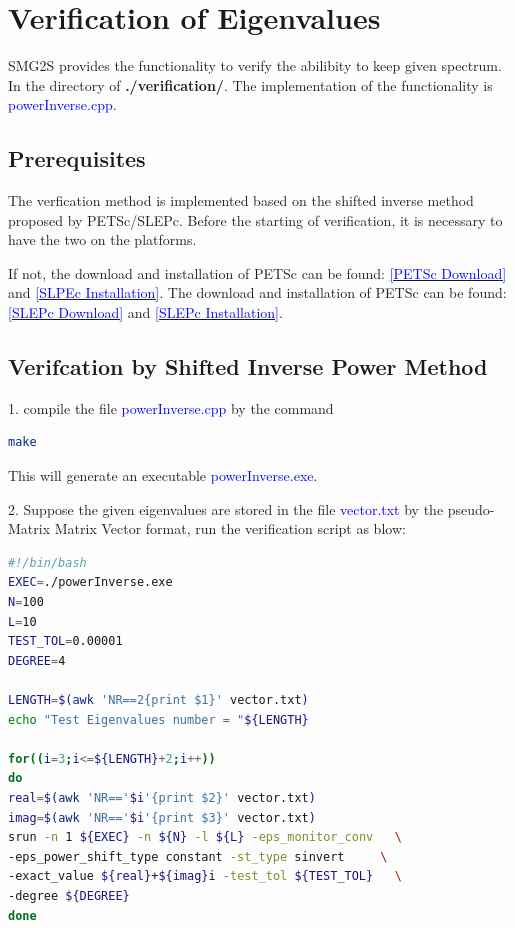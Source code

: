 \documentclass[a4paper, 10 pt]{report}
\begin{document}
	\chapter{Verification of Eigenvalues}
	
	SMG2S provides the functionality to verify the abilibity to keep given spectrum. In the directory of \textbf{./verification/}. The implementation of the functionality is \textcolor{blue}{powerInverse.cpp}.
	
	\section{Prerequisites}
	
	The verfication method is implemented based on the shifted inverse method proposed by PETSc/SLEPc. Before the starting of verification, it is necessary to have the two on the platforms.
	
	If not, the download and installation of PETSc can be found: \href{https://www.mcs.anl.gov/petsc/download/index.html}{\textcolor{blue}{[PETSc Download]}} and \href{https://www.mcs.anl.gov/petsc/documentation/installation.html}{\textcolor{blue}{[SLPEc Installation]}}. The download and installation of PETSc can be found: \href{http://slepc.upv.es/download/}{\textcolor{blue}{[SLEPc Download]}} and \href{http://slepc.upv.es/documentation/instal.htm}{\textcolor{blue}{[SLEPc Installation]}}.
	
	\section{Verifcation by Shifted Inverse Power Method}
	
	1. compile the file \textcolor{blue}{powerInverse.cpp} by the command
	
	\begin{lstlisting}[language=bash,frame=single]
   make
	\end{lstlisting}
	
	This will generate an executable  \textcolor{blue}{powerInverse.exe}.
	
	2. Suppose the given eigenvalues are stored in the file \textcolor{blue}{vector.txt} by the pseudo-Matrix Matrix Vector format, run the verification script as blow:
		\begin{lstlisting}[language=bash,frame=single]
#!/bin/bash
EXEC=./powerInverse.exe
N=100
L=10
TEST_TOL=0.00001
DEGREE=4

LENGTH=$(awk 'NR==2{print $1}' vector.txt)
echo "Test Eigenvalues number = "${LENGTH}

for((i=3;i<=${LENGTH}+2;i++))
do
real=$(awk 'NR=='$i'{print $2}' vector.txt)
imag=$(awk 'NR=='$i'{print $3}' vector.txt)
srun -n 1 ${EXEC} -n ${N} -l ${L} -eps_monitor_conv   \
-eps_power_shift_type constant -st_type sinvert     \
-exact_value ${real}+${imag}i -test_tol ${TEST_TOL}   \
-degree ${DEGREE}
done

   \end{lstlisting}
\end{document}
